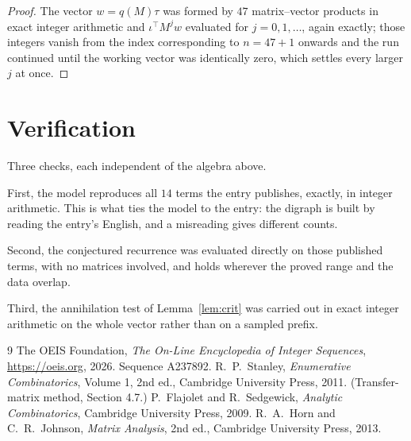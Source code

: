 \documentclass[11pt,a4paper]{article}
\theoremstyle{plain}
\theoremstyle{definition}
\begin{document}
\begin{proof}
The vector $w=q(M)\tau$ was formed by $47$ matrix--vector products in exact integer
arithmetic and $\iota^{\!\top}M^{j}w$ evaluated for $j=0,1,\dots$, again exactly; those
integers vanish from the index corresponding to $n=47+1$ onwards and the run continued
until the working vector was identically zero, which settles every larger $j$ at once.
\end{proof}

\section{Verification}

Three checks, each independent of the algebra above.

First, the model reproduces all $14$ terms the entry publishes, exactly, in integer
arithmetic. This is what ties the model to the entry: the digraph is built by reading the
entry's English, and a misreading gives different counts.

Second, the conjectured recurrence was evaluated directly on those published terms, with no
matrices involved, and holds wherever the proved range and the data overlap.

Third, the annihilation test of Lemma~\ref{lem:crit} was carried out in exact integer
arithmetic on the whole vector rather than on a sampled prefix.

\begin{thebibliography}{9}
 The OEIS Foundation, \emph{The On-Line Encyclopedia of Integer
Sequences}, \url{https://oeis.org}, 2026. Sequence A237892.
 R.~P.~Stanley, \emph{Enumerative Combinatorics}, Volume 1, 2nd ed.,
Cambridge University Press, 2011. (Transfer-matrix method, Section 4.7.)
 P.~Flajolet and R.~Sedgewick, \emph{Analytic Combinatorics}, Cambridge
University Press, 2009.
 R.~A.~Horn and C.~R.~Johnson, \emph{Matrix Analysis}, 2nd ed., Cambridge
University Press, 2013.
\end{thebibliography}
\end{document}
